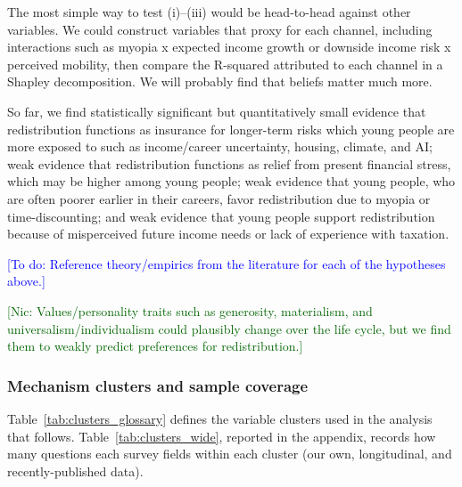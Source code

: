 \documentclass[11pt, headsepline]{article}
\newcommand{\nic}[1]{\noindent\textcolor{darkgreen}{[Nic: #1]}}
\newcommand{\todo}[1]{\noindent\textcolor{blue}{[To do: #1]}}
\begin{document}
The most simple way to test (i)–(iii) would be head-to-head against other variables. We could construct variables that proxy for each channel, including interactions such as myopia x expected income growth or downside income risk x perceived mobility, then compare the R-squared attributed to each channel in a Shapley decomposition. We will probably find that beliefs matter much more. 

So far, we find statistically significant but quantitatively small evidence that redistribution functions as insurance for longer-term risks which young people are more exposed to such as income/career uncertainty, housing, climate, and AI; weak evidence that redistribution functions as relief from present financial stress, which may be higher among young people; weak evidence that young people, who are often poorer earlier in their careers, favor redistribution due to myopia or time-discounting; and weak evidence that young people support redistribution because of misperceived future income needs or lack of experience with taxation.

\todo{Reference theory/empirics from the literature for each of the hypotheses above.}

\nic{Values/personality traits such as generosity, materialism, and universalism/individualism could plausibly change over the life cycle, but we find them to weakly predict preferences for redistribution.}

\newpage
\subsubsection{Mechanism clusters and sample coverage}


Table~\ref{tab:clusters_glossary} defines the variable clusters used in the analysis that follows. Table~\ref{tab:clusters_wide}, reported in the appendix, records how many questions each survey fields within each cluster (our own, longitudinal, and recently-published data).
\end{document}
